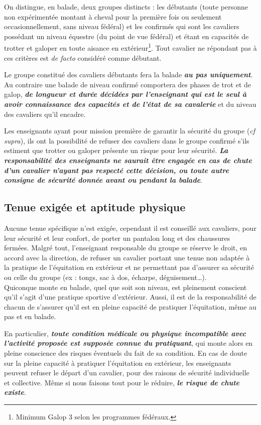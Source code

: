 \documentclass[11pt,a4paper]{article}
\renewcommand{\emph}[1]{\textit{\textbf{#1}}}
\begin{document}
      On distingue, en balade, deux groupes distincts : les \og débutants \fg{} (toute personne non expérimentée montant à cheval pour la première fois ou seulement occasionnellement, sans niveau fédéral) et les \og confirmés \fg{} qui sont les cavaliers possédant un niveau équestre (du point de vue fédéral) et étant en capacités de trotter et galoper en toute aisance en extérieur\footnote{Minimum Galop 3 selon les programmes fédéraux.}.
      Tout cavalier ne répondant pas à ces critères est \textit{de facto} considéré comme débutant.

      Le groupe constitué des cavaliers débutants fera la balade \emph{au pas uniquement}.
      Au contraire une balade de niveau confirmé comportera des phases de trot et de galop, \emph{de longueur et durée décidées par l'enseignant qui est le seul à avoir connaissance des capacités et de l'état de sa cavalerie} et du niveau des cavaliers qu'il encadre.

      Les enseignants ayant pour mission première de garantir la sécurité du groupe (\textit{cf supra}), ils ont la possibilité de refuser des cavaliers dans le groupe confirmé s'ils estiment que trotter ou galoper présente un risque pour leur sécurité. \emph{La responsabilité des enseignants ne saurait être engagée en cas de chute d'un cavalier n'ayant pas respecté cette décision, ou toute autre consigne de sécurité donnée avant ou pendant la balade}.

   \subsection*{Tenue exigée et aptitude physique}
      Aucune tenue spécifique n'est exigée, cependant il est conseillé aux cavaliers, pour leur sécurité et leur confort, de porter un pantalon long et des chaussures fermées.
      Malgré tout, l'enseignant responsable du groupe se réserve le droit, en accord avec la direction, de refuser un cavalier portant une tenue non adaptée à la pratique de l'équitation en extérieur et ne permettant pas d'assurer sa sécurité ou celle du groupe (ex : tongs, sac à dos, écharpe, déguisement\dots).\\

      Quiconque monte en balade, quel que soit son niveau, est pleinement conscient qu'il s'agit d'une pratique sportive d'extérieur.
      Aussi, il est de la responsabilité de chacun de s'assurer qu'il est en pleine capacité de pratiquer l'équitation, même au pas et en balade.

      En particulier, \emph{toute condition médicale ou physique incompatible avec l'activité proposée est supposée connue du pratiquant}, qui monte alors en pleine conscience des risques éventuels du fait de sa condition.
      En cas de doute sur la pleine capacité à pratiquer l'équitation en extérieur, les enseignants peuvent refuser le départ d'un cavalier, pour des raisons de sécurité individuelle et collective.
      Même si nous faisons tout pour le réduire, \emph{le risque de chute existe}.
\end{document}

